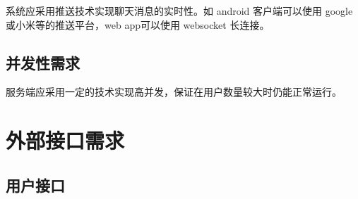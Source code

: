 系统应采用推送技术实现聊天消息的实时性。如 android 客户端可以使用 google 或小米等的推送平台，web app可以使用 websocket 长连接。


\subsection{并发性需求}

服务端应采用一定的技术实现高并发，保证在用户数量较大时仍能正常运行。

\section{外部接口需求}
\subsection{用户接口}
% 
% 
% 
% 
% 



